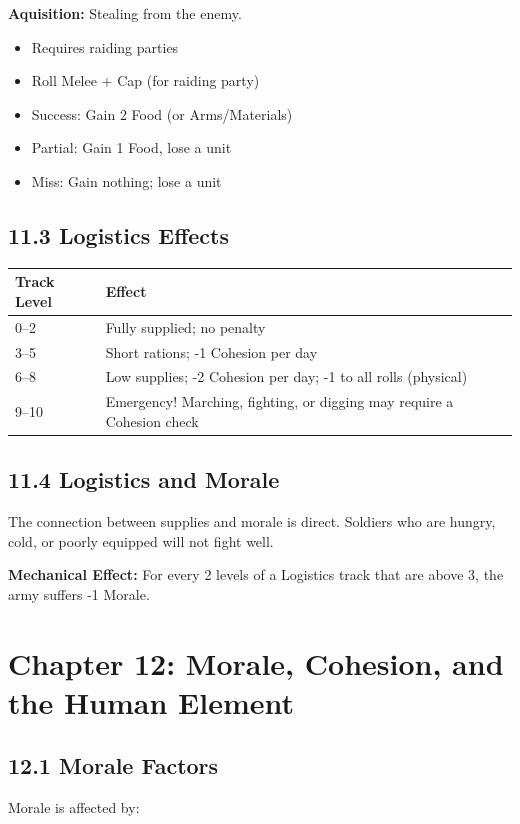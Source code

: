 \documentclass[11pt]{article}
\begin{document}
\textbf{Aquisition:} Stealing from the enemy.
\begin{itemize}
  \item Requires raiding parties
  \item Roll Melee + Cap (for raiding party)
  \item Success: Gain 2 Food (or Arms/Materials)
  \item Partial: Gain 1 Food, lose a unit
  \item Miss: Gain nothing; lose a unit
\end{itemize}

\subsection{11.3 Logistics Effects}

\begin{tabular}{|l|l|}
\hline
Track Level & Effect \\
\hline
0–2 & Fully supplied; no penalty \\
\hline
3–5 & Short rations; -1 Cohesion per day \\
\hline
6–8 & Low supplies; -2 Cohesion per day; -1 to all rolls (physical) \\
\hline
9–10 & Emergency! Marching, fighting, or digging may require a Cohesion check \\
\hline
\end{tabular}

\subsection{11.4 Logistics and Morale}

The connection between supplies and morale is direct. Soldiers who are hungry, cold, or poorly equipped will not fight well.

\textbf{Mechanical Effect:} For every 2 levels of a Logistics track that are above 3, the army suffers -1 Morale.

\section{Chapter 12: Morale, Cohesion, and the Human Element}

\subsection{12.1 Morale Factors}

Morale is affected by:
\end{document}
